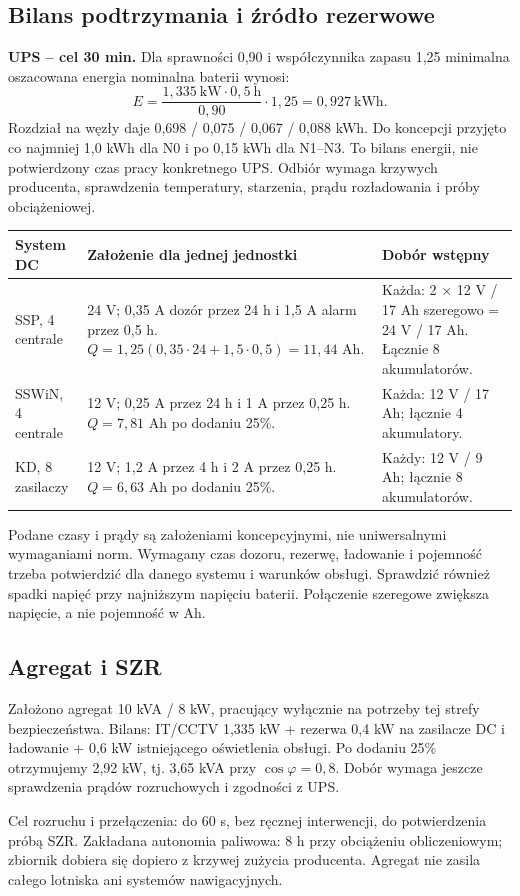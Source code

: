 \subsection{Bilans podtrzymania i źródło rezerwowe}
\textbf{UPS -- cel 30 min.} Dla sprawności 0,90 i współczynnika zapasu 1,25 minimalna oszacowana energia nominalna baterii wynosi:
\[
E=\frac{1{,}335\ \mathrm{kW}\cdot0{,}5\ \mathrm{h}}{0{,}90}\cdot1{,}25
=0{,}927\ \mathrm{kWh}.
\]
Rozdział na węzły daje 0,698 / 0,075 / 0,067 / 0,088 kWh. Do koncepcji przyjęto co najmniej 1,0 kWh dla N0 i po 0,15 kWh dla N1--N3. To bilans energii, nie potwierdzony czas pracy konkretnego UPS. Odbiór wymaga krzywych producenta, sprawdzenia temperatury, starzenia, prądu rozładowania i próby obciążeniowej.

\begin{tabularx}{\linewidth}{@{}P{24mm}Y Y@{}}
\toprule\textbf{System DC} & \textbf{Założenie dla jednej jednostki} & \textbf{Dobór wstępny}\\\midrule
SSP, 4 centrale & 24 V; 0,35 A dozór przez 24 h i 1,5 A alarm przez 0,5 h. $Q=1{,}25(0{,}35\cdot24+1{,}5\cdot0{,}5)=11{,}44$ Ah. & Każda: 2 $\times$ 12 V / 17 Ah szeregowo = 24 V / 17 Ah. Łącznie 8 akumulatorów.\\
SSWiN, 4 centrale & 12 V; 0,25 A przez 24 h i 1 A przez 0,25 h. $Q=7{,}81$ Ah po dodaniu 25\%. & Każda: 12 V / 17 Ah; łącznie 4 akumulatory.\\
KD, 8 zasilaczy & 12 V; 1,2 A przez 4 h i 2 A przez 0,25 h. $Q=6{,}63$ Ah po dodaniu 25\%. & Każdy: 12 V / 9 Ah; łącznie 8 akumulatorów.\\\bottomrule
\end{tabularx}

Podane czasy i prądy są założeniami koncepcyjnymi, nie uniwersalnymi wymaganiami norm. Wymagany czas dozoru, rezerwę, ładowanie i pojemność trzeba potwierdzić dla danego systemu i warunków obsługi. Sprawdzić również spadki napięć przy najniższym napięciu baterii. Połączenie szeregowe zwiększa napięcie, a nie pojemność w Ah.

\subsection*{Agregat i SZR}
Założono agregat 10 kVA / 8 kW, pracujący wyłącznie na potrzeby tej strefy bezpieczeństwa. Bilans: IT/CCTV 1,335 kW + rezerwa 0,4 kW na zasilacze DC i ładowanie + 0,6 kW istniejącego oświetlenia obsługi. Po dodaniu 25\% otrzymujemy 2,92 kW, tj. 3,65 kVA przy $\cos\varphi=0{,}8$. Dobór wymaga jeszcze sprawdzenia prądów rozruchowych i zgodności z UPS.

Cel rozruchu i przełączenia: do 60 s, bez ręcznej interwencji, do potwierdzenia próbą SZR. Zakładana autonomia paliwowa: 8 h przy obciążeniu obliczeniowym; zbiornik dobiera się dopiero z krzywej zużycia producenta. Agregat nie zasila całego lotniska ani systemów nawigacyjnych.
